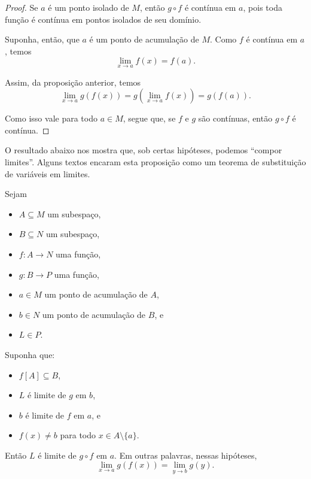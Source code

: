\begin{proof}
    Se $a$ é um ponto isolado de $M$, então $g\circ f$ é contínua em $a$, pois toda função é contínua em pontos isolados de seu domínio.

    Suponha, então, que $a$ é um ponto de acumulação de $M$.
    Como $f$ é contínua em $a$, temos
    \[
        \lim_{x\to a} f(x) = f(a).
    \]

    Assim, da proposição anterior, temos
    \[
        \lim_{x\to a} g(f(x)) = g\left(\lim_{x\to a} f(x)\right) = g(f(a)).
    \]

    Como isso vale para todo $a\in M$, segue que, se $f$ e $g$ são contínuas, então $g\circ f$ é contínua.
\end{proof}

O resultado abaixo nos mostra que, sob certas hipóteses, podemos ``compor limites''.
Alguns textos encaram esta proposição como um teorema de substituição de variáveis em limites.

\begin{proposition}\label{prop:substituicaoLimites}
    Sejam
    \begin{itemize}
        \item $A\subseteq M$ um subespaço,
        \item $B\subseteq N$ um subespaço,
        \item $f: A \to N$ uma função,
        \item $g: B \to P$ uma função,
        \item $a \in M$ um ponto de acumulação de $A$,
        \item $b \in N$ um ponto de acumulação de $B$, e
        \item $L \in P$.
    \end{itemize}


    Suponha que:
    \begin{itemize}
        \item $f[A] \subseteq B$,
        \item $L$ é limite de $g$ em $b$,
        \item $b$ é limite de $f$ em $a$, e
        \item $f(x)\neq b$ para todo $x \in A\setminus\{a\}$.
    \end{itemize}

    Então $L$ é limite de $g\circ f$ em $a$.
    Em outras palavras, nessas hipóteses,
    \[
        \lim_{x\to a} g(f(x)) = \lim_{y\to b} g(y).
    \]
\end{proposition}

